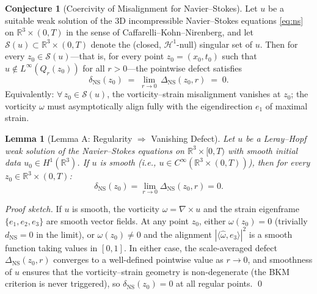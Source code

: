 \documentclass[11pt]{article}
\newtheorem{lemma}[theorem]{Lemma}
\theoremstyle{definition}
\newtheorem{conjecture}[theorem]{Conjecture}
\theoremstyle{remark}
\newcommand{\R}{\mathbb{R}}
\begin{document}
\begin{conjecture}[Coercivity of Misalignment for Navier--Stokes]
\label{conj:coercivity}
Let $u$ be a suitable weak solution of the 3D incompressible Navier--Stokes
equations \eqref{eq:ns} on $\R^3 \times (0,T)$ in the sense of
Caffarelli--Kohn--Nirenberg, and let $\mathcal{S}(u) \subset \R^3 \times (0,T)$
denote the (closed, $\mathcal{H}^1$-null) singular set of $u$.
Then for every $z_0 \in \mathcal{S}(u)$---that is, for every point
$z_0 = (x_0, t_0)$ such that $u \notin L^\infty(Q_r(z_0))$ for all $r > 0$---the
pointwise defect satisfies
\begin{equation}\label{eq:coercivity}
\delta_{\mathrm{NS}}(z_0) \;=\; \lim_{r \to 0}\, \Delta_{\mathrm{NS}}(z_0, r) \;=\; 0.
\end{equation}
Equivalently: $\forall\, z_0 \in \mathcal{S}(u)$, the vorticity--strain
misalignment vanishes at $z_0$; the vorticity $\omega$ must asymptotically
align fully with the eigendirection $e_1$ of maximal strain.
\end{conjecture}


\begin{lemma}[Lemma A: Regularity $\Rightarrow$ Vanishing Defect]
\label{lem:ns-A}
Let $u$ be a Leray--Hopf weak solution of the Navier--Stokes equations on
$\mathbb{R}^3 \times [0,T)$ with smooth initial data
$u_0 \in H^1(\mathbb{R}^3)$.  If $u$ is smooth
(i.e., $u \in C^\infty(\mathbb{R}^3 \times (0,T))$), then for every
$z_0 \in \mathbb{R}^3 \times (0,T)$:
\[
  \delta_{\mathrm{NS}}(z_0) = \lim_{r \to 0} \Delta_{\mathrm{NS}}(z_0, r) = 0.
\]
\end{lemma}

\begin{proof}[Proof sketch]
If $u$ is smooth, the vorticity $\omega = \nabla \times u$ and the strain
eigenframe $\{e_1, e_2, e_3\}$ are smooth vector fields.  At any point $z_0$,
either $\omega(z_0) = 0$ (trivially $d_{\mathrm{NS}} = 0$ in the limit), or
$\omega(z_0) \neq 0$ and the alignment $|\langle \hat{\omega}, e_3 \rangle|^2$
is a smooth function taking values in $[0,1]$.  In either case, the
scale-averaged defect $\Delta_{\mathrm{NS}}(z_0, r)$ converges to a
well-defined pointwise value as $r \to 0$, and smoothness of $u$ ensures that
the vorticity--strain geometry is non-degenerate (the BKM criterion is never
triggered), so $\delta_{\mathrm{NS}}(z_0) = 0$ at all regular points. \qed
\end{proof}
\end{document}
